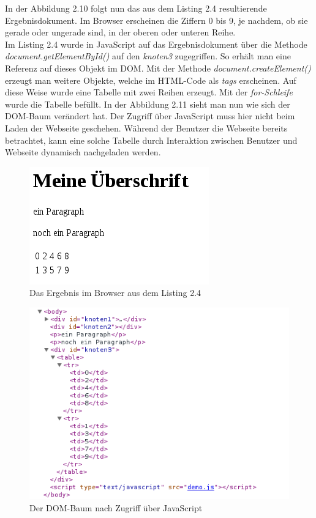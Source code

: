 In der Abbildung 2.10 folgt nun das aus dem Listing 2.4 resultierende Ergebnisdokument.
Im Browser erscheinen die Ziffern 0 bis 9, je nachdem, ob sie gerade oder ungerade sind, in der oberen oder unteren Reihe. \\
Im Listing 2.4 wurde in JavaScript auf das Ergebnisdokument \"uber die Methode \emph{document.getElementById()} auf den 
\emph{knoten3} zugegriffen. 
So erh\"alt man eine Referenz auf dieses Objekt im DOM. 
Mit der Methode \emph{document.createElement()} erzeugt man weitere Objekte, welche im HTML-Code als \emph{tags} erscheinen.
Auf diese Weise wurde eine Tabelle mit zwei Reihen erzeugt.
Mit der \emph{for-Schleife} wurde die Tabelle bef\"ullt.
In der Abbildung 2.11 sieht man nun wie sich der DOM-Baum ver\"andert hat.
Der Zugriff \"uber JavaScript muss hier nicht beim Laden der Webseite geschehen. 
W\"ahrend der Benutzer die Webseite bereits betrachtet, kann eine solche Tabelle durch Interaktion zwischen Benutzer und Webseite
dynamisch nachgeladen werden.\\

\begin{figure}[h]
  \centering
  \includegraphics[scale=0.6]{fotos/kapitel2/ergebnis_html_table.png}
  \caption{Das Ergebnis im Browser aus dem Listing 2.4}
 
\end{figure}



\begin{figure}[h]
  \centering
  \includegraphics[scale=0.7]{fotos/kapitel2/dom_elements_table.png}
  \caption{Der DOM-Baum nach Zugriff \"uber JavaScript}
 
\end{figure}


